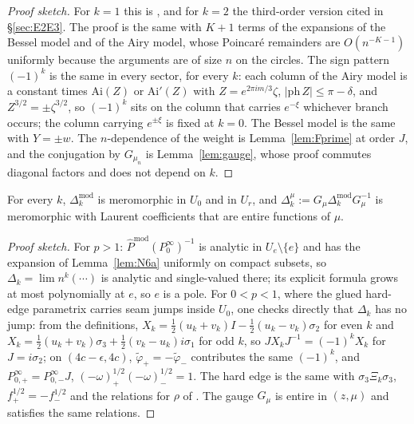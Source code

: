 \begin{proof}[Proof sketch]
For $k=1$ this is \cite[Lemmas~9.1, 9.2 and~10.6]{PaperII}, and for $k=2$ the third-order version cited in
\S\ref{sec:E2E3}. The proof is the same with $K+1$ terms of the expansions \cite[(10.40.1)--(10.40.4), (10.17.5),
(10.17.6), (10.17.11), (10.17.12)]{DLMF} of the Bessel model \cite[\S6]{KMVV} and \cite[(9.7.5)--(9.7.6)]{DLMF} of the
Airy model, whose Poincar\'e remainders are $O(n^{-K-1})$ uniformly because the arguments are of size $n$ on the circles.
The sign pattern $(-1)^k$ is the same in every sector, for every $k$: each column of the Airy model is a constant
times $\mathrm{Ai}(Z)$ or $\mathrm{Ai}'(Z)$ with $Z=e^{2\pi im/3}\zeta$, $|\mathrm{ph}\,Z|\le\pi-\delta$, and
$Z^{3/2}=\pm\zeta^{3/2}$, so $(-1)^k$ sits on the column that carries $e^{-\xi}$ whichever branch occurs; the column
carrying $e^{\pm\xi}$ is fixed at $k=0$. The Bessel model is the same with $Y=\pm w$. The $n$-dependence of the weight is
Lemma~\ref{lem:Fprime} at order $J$, and the conjugation by $G_{\mu_n}$ is Lemma~\ref{lem:gauge}, whose proof commutes
diagonal factors and does not depend on $k$.
\end{proof}

\begin{lemma}[meromorphy]\label{lem:N6b}
For every $k$, $\Delta_k^{\mathrm{mod}}$ is meromorphic in $U_0$ and in $U_r$, and $\Delta_k^\mu:=G_\mu\Delta_k^{\mathrm{mod}}G_\mu^{-1}$
is meromorphic with Laurent coefficients that are entire functions of $\mu$.
\end{lemma}

\begin{proof}[Proof sketch]
For $p>1$: $\hat P^{\mathrm{mod}}(P_0^\infty)^{-1}$ is analytic in $U_e\setminus\{e\}$ and has the expansion of
Lemma~\ref{lem:N6a} uniformly on compact subsets, so $\Delta_k=\lim n^k(\cdots)$ is analytic and single-valued there; its
explicit formula grows at most polynomially at $e$, so $e$ is a pole. For $0<p<1$, where the glued hard-edge parametrix
carries seam jumps inside $U_0$, one checks directly that $\Delta_k$ has no jump: from the definitions,
$X_k=\frac12(u_k+v_k)I-\frac12(u_k-v_k)\sigma_2$ for even $k$ and $X_k=\frac12(u_k+v_k)\sigma_3+\frac12(v_k-u_k)i\sigma_1$ for odd
$k$, so $JX_kJ^{-1}=(-1)^kX_k$ for $J=i\sigma_2$; on $(4c-\epsilon,4c)$, $\tilde\varphi_+=-\tilde\varphi_-$ contributes the same
$(-1)^k$, and $P^\infty_{0,+}=P^\infty_{0,-}J$, $(-\omega)^{1/2}_+(-\omega)^{1/2}_-=1$. The hard edge is the same with
$\sigma_3\Xi_k\sigma_3$, $f^{1/2}_+=-f^{1/2}_-$ and the relations for $\rho$ of \cite[Section~10]{PaperII}. The gauge
$G_\mu$ is entire in $(z,\mu)$ and satisfies the same relations.
\end{proof}

